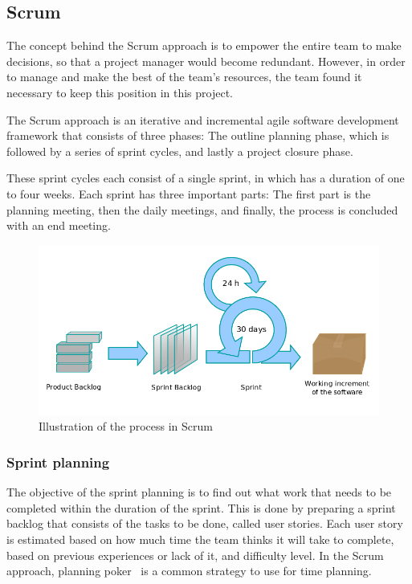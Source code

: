 \subsection{Scrum}
The concept behind the Scrum approach is to empower the entire team to make
decisions, so that a project manager would become redundant. However, in order
to manage and make the best of the team's resources, the team found it
necessary to keep this position in this project.

The Scrum approach is an iterative and incremental agile software development
framework that consists of three phases: The outline planning phase, which is
followed by a series of sprint cycles, and lastly a project closure phase.

These sprint cycles each consist of a single sprint, in which has a duration of
one to four weeks. Each sprint has three important parts: The first part is the
planning meeting, then the daily  meetings, and finally, the process is
concluded with an end meeting.
\begin{figure}[H]
\includegraphics[width=\textwidth]{ch/projectManagement/fig/scrumProcess.png}
\caption{Illustration of the process in Scrum}
\end{figure}

\subsubsection{Sprint planning}
\label{sec:sprintplanning}
The objective of the sprint planning is to find out what work that needs to be completed within the duration of the sprint. This is done by preparing a sprint backlog that consists of the tasks to be done, called user stories. Each user story is estimated based on how much time the team thinks it will take to complete, based on previous experiences or lack of it, and difficulty level. In the Scrum approach, planning poker~\cite{planningpoker} is a common strategy to use for time planning.

